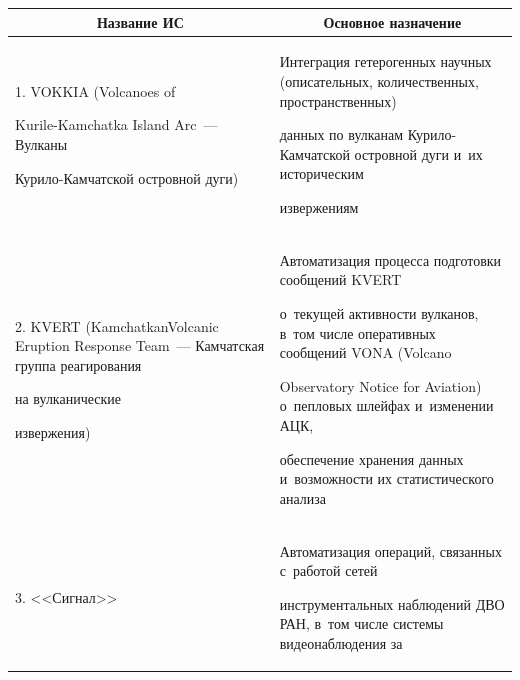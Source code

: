 \begin{table}\small %


\begin{center}




\vspace*{2ex}








\begin{tabular}{|p{40mm}|p{82mm}|}


\hline


\multicolumn{1}{|c|}{Название ИС}&\multicolumn{1}{c|}{Основное назначение}\\


\hline


1. VOKKIA (Volcanoes of  


Kurile-Kamchatka Island Arc~--- Вулканы 


Ку\-ри\-ло-Кам\-чат\-ской островной дуги)~\cite{3-kor} 


&Интеграция гетерогенных научных (описательных, количественных, пространственных) 


данных по вулканам Ку\-ри\-ло-Кам\-чат\-ской островной дуги и~их историческим 


извержениям\\


\hline


2. KVERT (Kam\-chat\-kan\linebreak Volcanic Eruption Response Team~--- Камчатская группа реагирования 


на вулканические  


извержения)~\cite{4-kor} &Автоматизация процесса подготовки сообщений KVERT 


о~текущей активности вулканов, в~том числе оперативных сообщений VONA (Volcano 


Observatory Notice for Aviation) о~пепловых шлейфах и~изменении АЦК, 


обеспечение хранения данных и~возможности их статистического анализа\\


\hline


3. <<Сигнал>>~\cite{5-kor, 6-kor} &Автоматизация операций, связанных с~работой сетей 


инструментальных наблюдений ДВО РАН, в~том чис\-ле системы видеонаблюдения за 



\end{tabular}
\end{center}
\end{table}
